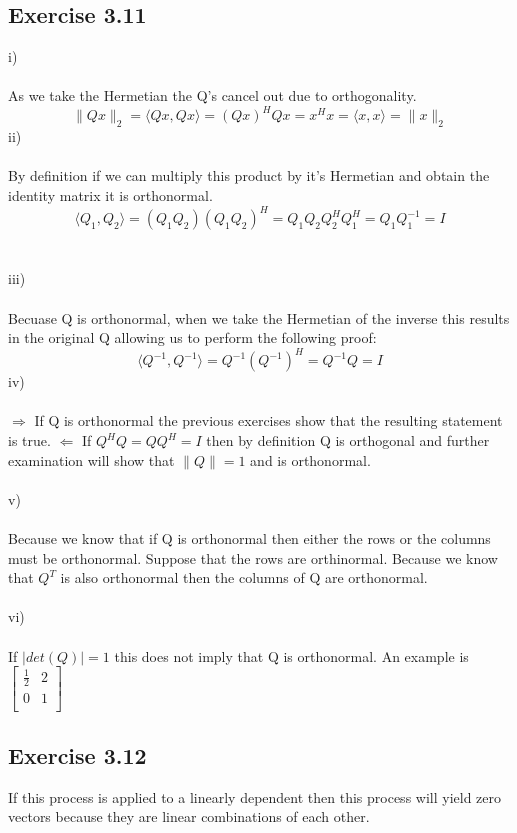 \documentclass[letterpaper,12pt]{article}
\theoremstyle{definition}
\begin{document}
\subsection*{Exercise 3.11}
i) \\ \\
As we take the Hermetian the Q's cancel out due to orthogonality. 
\[   \|Qx\|_{2} =  \langle Qx,Qx \rangle = (Qx)^HQx = x^Hx = \langle x,x\rangle = \|x\|_{2}  \]
ii) \\ \\
By definition if we can multiply this product by it's Hermetian and obtain the identity matrix it is orthonormal.
\[\langle Q_{1},Q_{2}\rangle = (Q_{1}Q_{2})(Q_{1}Q_{2})^H = Q_{1}Q_{2}Q_{2}^HQ_{1}^H= Q_{1}Q_{1}^{-1} = I \]
\\ \\
iii) \\ \\
Becuase Q is orthonormal, when we take the Hermetian of the inverse this results in the original Q allowing us to perform the following proof:
\[\langle Q^{-1},Q^{-1}\rangle = Q^{-1}(Q^{-1})^H = Q^{-1}Q = I\]
iv) \\ \\
$\Rightarrow$ If Q is orthonormal the previous exercises show that the resulting statement is true. 
$\Leftarrow$ If $Q^HQ=QQ^H=I$ then by definition Q is orthogonal and further examination will show that $\|Q\| = 1$ and is orthonormal. \\ \\
v) \\ \\
Because we know that if Q is orthonormal then either the rows or the columns must be orthonormal. Suppose that the rows are orthinormal. Because we know that $Q^{T}$ is also orthonormal then the columns of Q are orthonormal. \\ \\
vi) \\ \\
If $|det(Q)| = 1$ this does not imply that Q is orthonormal. An example is 
$[\begin{matrix}
\frac{1}{2} & 2\\
0 & 1\\
\end{matrix}]$

\subsection*{Exercise 3.12}
If this process is applied to a linearly dependent then this process will yield zero vectors because they are linear combinations of each other. 
\end{document}
